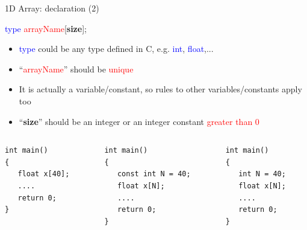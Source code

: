 \begin{frame}[fragile]{1D Array: declaration (2)}
\begin{center}
 \LARGE{
	\textcolor{blue}{type} \textcolor{red}{arrayName}[\textbf{size}];
	}
\end{center}
\begin{itemize}
	\item {\textcolor{blue}{type} could be any type defined in C, e.g. \textcolor{blue}{int}, \textcolor{blue}{float},...}
	\item {``\textcolor{red}{arrayName}'' should be \textcolor{red}{unique}}
	\item {It is actually a variable/constant, so rules to other variables/constants apply too}
	\item {``\textbf{size}'' should be an integer or an integer constant \textcolor{red}{greater than 0}}
\end{itemize}
\begin{columns}
\begin{column}{0.25\linewidth}
\begin{lstlisting}
int main()
{
   float x[40];
   ....
   return 0;
}

\end{lstlisting}
\end{column}
\begin{column}{0.35\linewidth}
\begin{lstlisting}
int main()
{
   const int N = 40;
   float x[N];
   ....
   return 0;
}

\end{lstlisting}
\end{column}
\begin{column}{0.3\linewidth}
\begin{lstlisting}
int main()
{
   int N = 40;
   float x[N];
   ....
   return 0;
}

\end{lstlisting}
\end{column}
\end{columns}
\end{frame}

